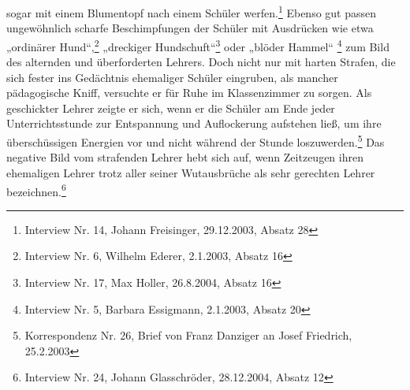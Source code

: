 \documentclass[a4paper]{article}
\begin{document}
sogar mit einem Blumentopf nach einem Schüler werfen.\footnote{
Interview Nr. 14, Johann Freisinger, 29.12.2003, Absatz 28} Ebenso gut
passen ungewöhnlich scharfe Beschimpfungen der Schüler mit Ausdrücken
wie etwa „ordinärer Hund“,\footnote{ Interview Nr. 6, Wilhelm Ederer,
2.1.2003, Absatz 16} „dreckiger Hundschuft“\footnote{ Interview Nr. 17,
Max Holler, 26.8.2004, Absatz 16} oder „blöder Hammel“ \footnote{
Interview Nr. 5, Barbara Essigmann, 2.1.2003, Absatz 20} zum Bild des
alternden und überforderten Lehrers. Doch nicht nur mit harten Strafen,
die sich fester ins Gedächtnis ehemaliger Schüler eingruben, als
mancher pädagogische Kniff, versuchte er für Ruhe im Klassenzimmer zu
sorgen. Als geschickter Lehrer zeigte er sich, wenn er die Schüler am
Ende jeder Unterrichtsstunde zur Entspannung und Auflockerung aufstehen
ließ, um ihre überschüssigen Energien vor und nicht während der Stunde
loszuwerden.\footnote{ Korrespondenz Nr. 26, Brief von Franz Danziger
an Josef Friedrich, 25.2.2003} Das negative Bild vom strafenden Lehrer
hebt sich auf, wenn Zeitzeugen ihren ehemaligen Lehrer trotz aller
seiner Wutausbrüche als sehr gerechten Lehrer bezeichnen.\footnote{
Interview Nr. 24, Johann Glasschröder, 28.12.2004, Absatz 12}
\end{document}
